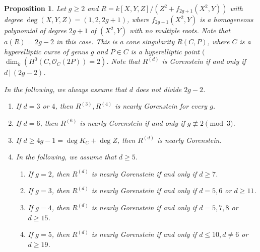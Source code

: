 \documentclass[10pt,a4paper]{amsart}
\newtheorem{prop}{Proposition}
\newcommand{\cO}{\mathcal O}
\begin{document}
\begin{prop}\label{hypell} 
Let $g\ge 2$ and $R= k[X,Y,Z]/(Z^2 + f_{2g+ 1}(X^2,Y))$ with degree 
$\deg (X,Y,Z) = (1,2, 2g+1)$, where $f_{2g+1 }(X^2,Y)$ is a 
homogeneous polynomial of 
degree $2g+1$ of $(X^2, Y)$ with no multiple roots.
Note that $a(R)= 2g-2$ in this case. 
This is a cone singularity $R(C,P)$, where 
$C$ is a hyperelliptic curve of genus $g$ and $P\in C$ is a hyperelliptic point 
$($$\dim_k( H^0(C, \cO_C(2P))=2)$. 
Note that $R^{(d)}$ is Gorenstein if and only if $d \,|\, (2g-2)$.   
\par
In the following, we always assume that $d$ does not divide $2g-2$. 
\begin{enumerate}
\item[(1)] If $d=3$ or $4$, then $R^{(3)}, R^{(4)}$ is nearly Gorenstein for every $g$.
\item[(2)] If $d=6$, then $R^{(6)}$ is nearly Gorenstein 
if and only if $g \not\equiv 2 \pmod{3}$. 
\item[(3)] If $d\ge 4g-1 = \deg K_C + \deg Z$, then $R^{(d)}$ is nearly Gorenstein. 
\item[(4)] In the following, we assume that $d\ge 5$. 
\begin{enumerate}
\item[{\rm (a)}] If $g=2$, then $R^{(d)}$ is nearly Gorenstein if and only if $d\ge 7$.
\item[{\rm (b)}]  If $g=3$, then $R^{(d)}$ is nearly Gorenstein if and only if $d=5, 6$ or 
$d\ge 11$.
\item[{\rm (c)}] 
 If $g=4$, then $R^{(d)}$ is nearly Gorenstein if and only if 
$d =5,7, 8$ or $d\ge 15$.
\item[{\rm (d)}]  If $g=5$, then $R^{(d)}$ is nearly Gorenstein if and only if 
$d \le 10, d\ne 6$ or $d\ge 19$.
\end{enumerate}
\end{enumerate}
\end{prop}
\end{document}
